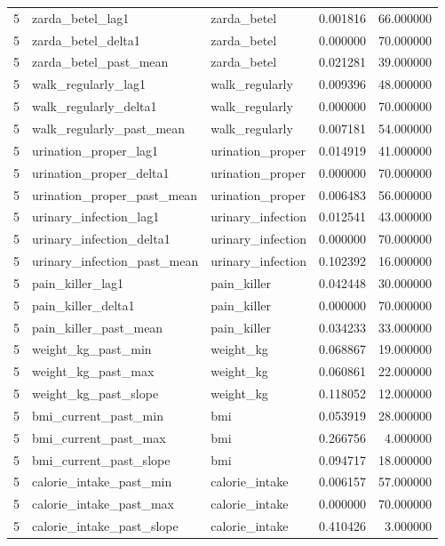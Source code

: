 \begin{longtable}{rllrr}
5 & zarda\_betel\_lag1 & zarda\_betel & 0.001816 & 66.000000 \\
5 & zarda\_betel\_delta1 & zarda\_betel & 0.000000 & 70.000000 \\
5 & zarda\_betel\_past\_mean & zarda\_betel & 0.021281 & 39.000000 \\
5 & walk\_regularly\_lag1 & walk\_regularly & 0.009396 & 48.000000 \\
5 & walk\_regularly\_delta1 & walk\_regularly & 0.000000 & 70.000000 \\
5 & walk\_regularly\_past\_mean & walk\_regularly & 0.007181 & 54.000000 \\
5 & urination\_proper\_lag1 & urination\_proper & 0.014919 & 41.000000 \\
5 & urination\_proper\_delta1 & urination\_proper & 0.000000 & 70.000000 \\
5 & urination\_proper\_past\_mean & urination\_proper & 0.006483 & 56.000000 \\
5 & urinary\_infection\_lag1 & urinary\_infection & 0.012541 & 43.000000 \\
5 & urinary\_infection\_delta1 & urinary\_infection & 0.000000 & 70.000000 \\
5 & urinary\_infection\_past\_mean & urinary\_infection & 0.102392 & 16.000000 \\
5 & pain\_killer\_lag1 & pain\_killer & 0.042448 & 30.000000 \\
5 & pain\_killer\_delta1 & pain\_killer & 0.000000 & 70.000000 \\
5 & pain\_killer\_past\_mean & pain\_killer & 0.034233 & 33.000000 \\
5 & weight\_kg\_past\_min & weight\_kg & 0.068867 & 19.000000 \\
5 & weight\_kg\_past\_max & weight\_kg & 0.060861 & 22.000000 \\
5 & weight\_kg\_past\_slope & weight\_kg & 0.118052 & 12.000000 \\
5 & bmi\_current\_past\_min & bmi & 0.053919 & 28.000000 \\
5 & bmi\_current\_past\_max & bmi & 0.266756 & 4.000000 \\
5 & bmi\_current\_past\_slope & bmi & 0.094717 & 18.000000 \\
5 & calorie\_intake\_past\_min & calorie\_intake & 0.006157 & 57.000000 \\
5 & calorie\_intake\_past\_max & calorie\_intake & 0.000000 & 70.000000 \\
5 & calorie\_intake\_past\_slope & calorie\_intake & 0.410426 & 3.000000 \\
\end{longtable}
